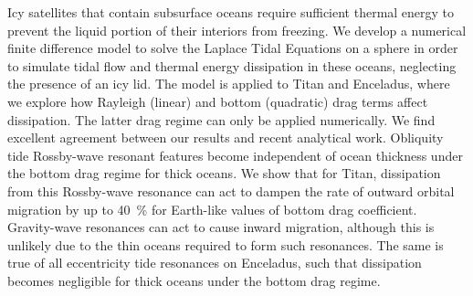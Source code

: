 Icy satellites that contain subsurface oceans require sufficient thermal energy to prevent the liquid portion of their interiors from freezing. We develop a numerical finite difference model to solve the Laplace Tidal Equations on a sphere in order to simulate tidal flow and thermal energy dissipation in these oceans, neglecting the presence of an icy lid. The model is applied to Titan and Enceladus, where we explore how Rayleigh (linear) and bottom (quadratic) drag terms affect dissipation. The latter drag regime can only be applied numerically. We find excellent agreement between our results and recent analytical work. Obliquity tide Rossby-wave resonant features become independent of ocean thickness under the bottom drag regime for thick oceans. We show that for Titan, dissipation from this Rossby-wave resonance can act to dampen the rate of outward orbital migration by up to \SI{40}{\percent} for Earth-like values of bottom drag coefficient. Gravity-wave resonances can act to cause inward migration, although this is unlikely due to the thin oceans required to form such resonances. The same is true of all eccentricity tide resonances on Enceladus, such that dissipation becomes negligible for thick oceans under the bottom drag regime.  